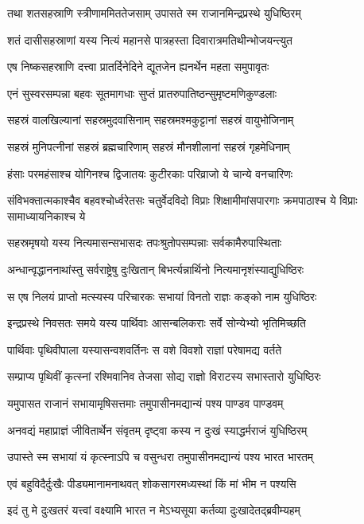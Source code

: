 \twolineshloka
{तथा शतसहस्राणि स्त्रीणाममिततेजसाम्}
{उपासते स्म राजानमिन्द्रप्रस्थे युधिष्ठिरम्}


\twolineshloka
{शतं दासीसहस्राणां यस्य नित्यं महानसे}
{पात्रहस्ता दिवारात्रमतिथीन्भोजयन्त्युत}


\twolineshloka
{एष निष्कसहस्राणि दत्त्वा प्रातर्दिनेदिने}
{द्यूतजेन ह्यनर्थेन महता समुपावृतः}


\twolineshloka
{एनं सुस्वरसम्पन्ना बहवः सूतमागधाः}
{सुप्तं प्रातरुपातिष्ठन्सुमृष्टमणिकुण्डलाः}


\twolineshloka
{सहस्रं वालखिल्यानां सहस्रमुदवासिनाम्}
{सहस्रमश्मकुट्टानां सहस्रं वायुभोजिनाम्}


\twolineshloka
{सहस्रं मुनिपत्नीनां सहस्रं ब्रह्मचारिणाम्}
{सहस्रं मौनशीलानां सहस्रं गृहमेधिनाम्}


\twolineshloka
{हंसाः परमहंसाश्च योगिनश्च द्विजातयः}
{कुटीरकाः परिव्राजो ये चान्ये वनचारिणः}


\threelineshloka
{संविभक्तात्मकाश्चैव बहवश्चोर्ध्वरेतसः}
{चतुर्वेदविदो विप्राः शिक्षामीमांसपारगाः}
{क्रमपाठाश्च ये विप्राः सामाध्यायनिकाश्च ये}


\twolineshloka
{सहस्रमृषयो यस्य नित्यमासन्सभासदः}
{तपःश्रुतोपसम्पन्नाः सर्वकामैरुपास्थिताः}


\twolineshloka
{अन्धान्वृद्धाननाथांस्तु सर्वराष्ट्रेषु दुःखितान्}
{बिभर्त्यन्नार्थिनो नित्यमानृशंस्याद्युधिष्ठिरः}


\twolineshloka
{स एष निलयं प्राप्तो मत्स्यस्य परिचारकः}
{सभायां विनतो राज्ञः कङ्को नाम युधिष्ठिरः}


\twolineshloka
{इन्द्रप्रस्थे निवसतः समये यस्य पार्थिवाः}
{आसन्बलिकराः सर्वे सोन्येभ्यो भृतिमिच्छति}


\twolineshloka
{पार्थिवाः पृथिवीपाला यस्यासन्वशवर्तिनः}
{स वशे विवशो राज्ञां परेषामद्य वर्तते}


\twolineshloka
{सम्प्राप्य पृथिवीं कृत्स्नां रश्मिवानिव तेजसा}
{सोद्य राज्ञो विराटस्य सभास्तारो युधिष्ठिरः}


\twolineshloka
{यमुपासत राजानं सभायामृषिसत्तमाः}
{तमुपासीनमद्यान्यं पश्य पाण्डव पाण्डवम्}


\twolineshloka
{अनवद्यं महाप्राज्ञं जीवितार्थेन संवृतम्}
{दृष्ट्वा कस्य न दुःखं स्याद्धर्मराजं युधिष्ठिरम्}


\twolineshloka
{उपास्ते स्म सभायां यं कृत्स्नाऽपि च वसुन्धरा}
{तमुपासीनमद्यान्यं पश्य भारत भारतम्}


\twolineshloka
{एवं बहुविदैर्दुःखैः पीड्यमानामनाथवत्}
{शोकसागरमध्यस्थां किं मां भीम न पश्यसि}


\twolineshloka
{इदं तु मे दुःखतरं यत्त्वां वक्ष्यामि भारत}
{न मेऽभ्यसूया कर्तव्या दुःखादेतद्ब्रवीम्यहम्}


